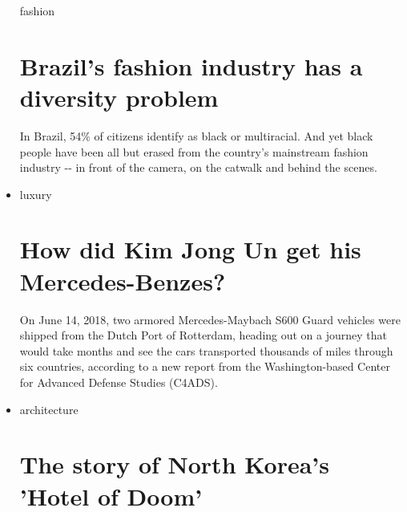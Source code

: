 \begin{itemize}
  fashion

  \href{/style/article/brazil-fashion-diversity/index.html}{}

  \hypertarget{brazils-fashion-industry-has-a-diversity-problem}{%
  \section{Brazil's fashion industry has a diversity
  problem}\label{brazils-fashion-industry-has-a-diversity-problem}}

  \href{/style/article/brazil-fashion-diversity/index.html}{}

  In Brazil, 54\% of citizens identify as black or multiracial. And yet
  black people have been all but erased from the country's mainstream
  fashion industry -\/- in front of the camera, on the catwalk and
  behind the scenes.
\item
  \href{/style/luxury}{}

  luxury

  \href{/style/article/north-korea-luxury-vehicles-intl-hnk/index.html}{}

  \hypertarget{how-did-kim-jong-un-get-his-mercedes-benzes}{%
  \section{How did Kim Jong Un get his
  Mercedes-Benzes?}\label{how-did-kim-jong-un-get-his-mercedes-benzes}}

  \href{/style/article/north-korea-luxury-vehicles-intl-hnk/index.html}{}

  On June 14, 2018, two armored Mercedes-Maybach S600 Guard vehicles
  were shipped from the Dutch Port of Rotterdam, heading out on a
  journey that would take months and see the cars transported thousands
  of miles through six countries, according to a new report from the
  Washington-based Center for Advanced Defense Studies (C4ADS).
\item
  \href{/style/architecture}{}

  architecture

  \href{/style/article/ryugyong-hotel-architecture-origins/index.html}{}

  \hypertarget{the-story-of-north-koreas-hotel-of-doom}{%
  \section{The story of North Korea's 'Hotel of
  Doom'}\label{the-story-of-north-koreas-hotel-of-doom}}


\end{itemize}
